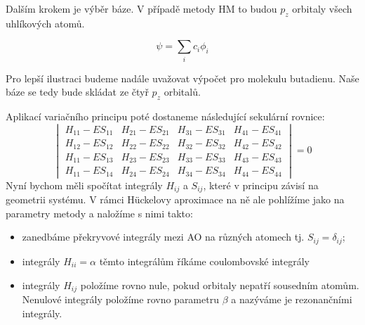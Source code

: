 Dalším krokem je výběr báze. V případě metody HM to budou $p_z$ orbitaly všech uhlíkových atomů.

\begin{equation}
\psi= \sum_i c_i \phi_i
\label{rov:HM_MO}
\end{equation}

Pro lepší ilustraci budeme nadále uvažovat výpočet pro molekulu butadienu.
Naše báze se tedy bude skládat ze čtyř $p_z$ orbitalů.

Aplikací variačního principu poté dostaneme následující sekulární rovnice:
\begin{equation}
\begin{vmatrix}
H_{11}-ES_{11} & H_{21}-ES_{21} & H_{31}-ES_{31} & H_{41}-ES_{41}  \\
H_{12}-ES_{12} & H_{22}-ES_{22} & H_{32}-ES_{32} & H_{42}-ES_{42}  \\
H_{11}-ES_{13} & H_{23}-ES_{23} & H_{33}-ES_{33} & H_{43}-ES_{43}  \\
H_{11}-ES_{14} & H_{24}-ES_{24} & H_{34}-ES_{34} & H_{44}-ES_{44}
\end{vmatrix}
= 0
\end{equation}
Nyní bychom měli spočítat integrály $H_{ij}$ a $S_{ij}$, které v principu závisí na geometrii systému.
V rámci H\"{u}ckelovy aproximace na ně ale pohlížíme jako na parametry metody
a naložíme s nimi takto:
\begin{itemize}
\item zanedbáme překryvové integrály mezi AO na různých atomech tj. $S_{ij}=\delta_{ij}$;
\item integrály $H_{ii}=\alpha$ těmto integrálům říkáme coulombovské integrály
\item integrály $H_{ij}$ položíme rovno nule, pokud orbitaly nepatří sousedním atomům.
Nenulové integrály položíme rovno parametru $\beta$ a nazýváme je rezonančními integrály.
\end{itemize}

